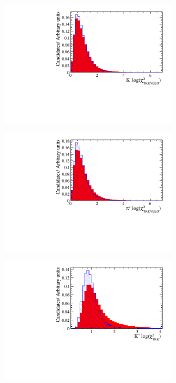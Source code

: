 \begin{figure}[!h]
\begin{subfigure}[t]{0.22\textwidth}
      \includegraphics[width=1.0\textwidth]{figs/Selection/Ds_BDT_Var_Ds2KKPi_D_K1_BDT_TRACK_VeloCHI2NDOF.pdf}
   \end{subfigure}
   \begin{subfigure}[t]{0.22\textwidth}
      \centering
      \includegraphics[width=1.0\textwidth]{figs/Selection/Ds_BDT_Var_Ds2KKPi_D_P_BDT_TRACK_VeloCHI2NDOF.pdf}
   \end{subfigure}
   \begin{subfigure}[t]{0.22\textwidth}
      \centering
      \includegraphics[width=1.0\textwidth]{figs/Selection/Ds_BDT_Var_Ds2KKPi_D_K0_TRACK_CHI2NDOF.pdf}

\end{subfigure}
\end{figure}
